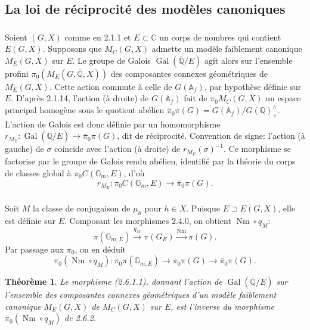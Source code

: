 \documentclass[12pt,a4paper]{article}
\theoremstyle{plain}
\newtheorem{theorem}{Th\'eor\`eme}[section]
\theoremstyle{definition}
\theoremstyle{remark}
\DeclareMathOperator{\Gal}{Gal}
\DeclareMathOperator{\Nm}{Nm}
\newcommand{\QQ}{\mathbb{Q}}
\newcommand{\CC}{\mathbb{C}}
\newcommand{\Af}{\mathbb{A}_f}
\newcommand{\Gm}{\mathbb{G}}
\begin{document}
\subsection{La loi de r\'eciprocit\'e des mod\`eles canoniques}

\subsubsection{}

Soient $(G,X)$ comme en 2.1.1 et $E \subset \CC$ un corps de nombres qui contient $E(G,X)$. Supposons que $M_C(G,X)$ admette un mod\`ele faiblement canonique $M_E(G,X)$ sur $E$. Le groupe de Galois $\Gal(\overline{\QQ}/E)$ agit alors sur l'ensemble profini $\pi_0(M_E(G,\overline{\QQ},X))$ des composantes connexes g\'eom\'etriques de $M_E(G,X)$. Cette action commute \`a celle de $G(\Af)$, par hypoth\`ese d\'efinie sur $E$. D'apr\`es 2.1.14, l'action (\`a droite) de $G(\Af)$ fait de $\pi_0 M_C(G,X)$ un espace principal homog\`ene sous le quotient ab\'elien $\bar{\pi}_0\pi(G) = G(\Af)/G(\QQ)_+^{\wedge}$. L'action de Galois est donc d\'efinie par un homomorphisme $r_{M_E}: \Gal(\overline{\QQ}/E) \to \bar{\pi}_0\pi(G)$, dit de r\'eciprocit\'e. Convention de signe: l'action (\`a gauche) de $\sigma$ co\'incide avec l'action (\`a droite) de $r_{M_E}(\sigma)^{-1}$. Ce morphisme se factorise par le groupe de Galois rendu ab\'elien, identifi\'e par la th\'eorie du corps de classes global \`a $\pi_0 C(\Gm_m,E)$, d'o\`u
\begin{equation}\label{eq:2.6.1.1}
r_{M_E}: \pi_0 C(\Gm_m,E) \to \bar{\pi}_0\pi(G).
\end{equation}

\subsubsection{}

Soit $M$ la classe de conjugaison de $\mu_h$ pour $h \in X$. Puisque $E \supset E(G,X)$, elle est d\'efinie sur $E$. Composant les morphismes 2.4.0, on obtient $\Nm \circ q_M$:
\[
\pi(\Gm_{m,E}) \xrightarrow{q_M} \pi(G_E) \xrightarrow{\Nm} \pi(G).
\]
Par passage aux $\pi_0$, on en d\'eduit
\begin{equation}\label{eq:2.6.2.1}
\pi_0(\Nm \circ q_M): \pi_0\pi(\Gm_{m,E}) \to \pi_0\pi(G) \to \bar{\pi}_0\pi(G).
\end{equation}

\begin{theorem}
Le morphisme (2.6.1.1), donnant l'action de $\Gal(\overline{\QQ}/E)$ sur l'ensemble des composantes connexes g\'eom\'etriques d'un mod\`ele faiblement canonique $M_E(G,X)$ de $M_C(G,X)$ sur $E$, est l'inverse du morphisme $\pi_0(\Nm \circ q_M)$ de 2.6.2.
\end{theorem}
\end{document}
